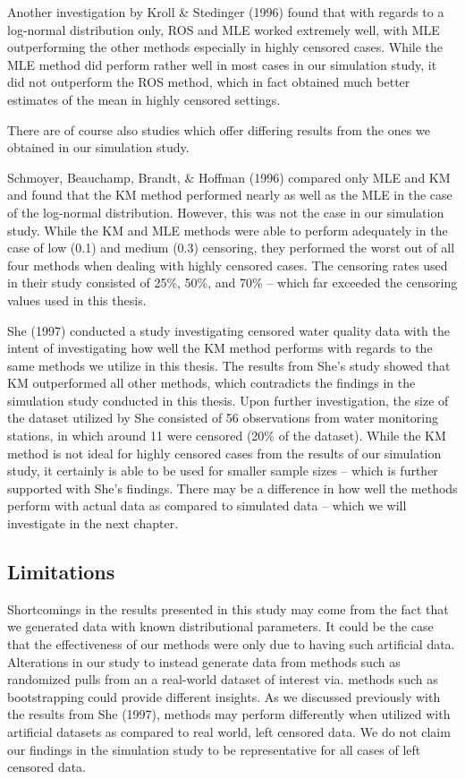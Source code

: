 \documentclass[12pt, twoside]{amherstthesis}
\begin{document}
Another investigation by Kroll \& Stedinger (1996) found that with regards to a log-normal distribution only, ROS and MLE worked extremely well, with MLE outperforming the other methods especially in highly censored cases. While the MLE method did perform rather well in most cases in our simulation study, it did not outperform the ROS method, which in fact obtained much better estimates of the mean in highly censored settings.

There are of course also studies which offer differing results from the ones we obtained in our simulation study.

Schmoyer, Beauchamp, Brandt, \& Hoffman (1996) compared only MLE and KM and found that the KM method performed nearly as well as the MLE in the case of the log-normal distribution. However, this was not the case in our simulation study. While the KM and MLE methods were able to perform adequately in the case of low (0.1) and medium (0.3) censoring, they performed the worst out of all four methods when dealing with highly censored cases. The censoring rates used in their study consisted of 25\%, 50\%, and 70\% -- which far exceeded the censoring values used in this thesis.

She (1997) conducted a study investigating censored water quality data with the intent of investigating how well the KM method performs with regards to the same methods we utilize in this thesis. The results from She's study showed that KM outperformed all other methods, which contradicts the findings in the simulation study conducted in this thesis. Upon further investigation, the size of the dataset utilized by She consisted of 56 observations from water monitoring stations, in which around 11 were censored (20\% of the dataset). While the KM method is not ideal for highly censored cases from the results of our simulation study, it certainly is able to be used for smaller sample sizes -- which is further supported with She's findings. There may be a difference in how well the methods perform with actual data as compared to simulated data -- which we will investigate in the next chapter.

\hypertarget{limitations}{%
\subsection{Limitations}\label{limitations}}

Shortcomings in the results presented in this study may come from the fact that we generated data with known distributional parameters. It could be the case that the effectiveness of our methods were only due to having such artificial data. Alterations in our study to instead generate data from methods such as randomized pulls from an a real-world dataset of interest via. methods such as bootstrapping could provide different insights. As we discussed previously with the results from She (1997), methods may perform differently when utilized with artificial datasets as compared to real world, left censored data. We do not claim our findings in the simulation study to be representative for all cases of left censored data.
\end{document}
